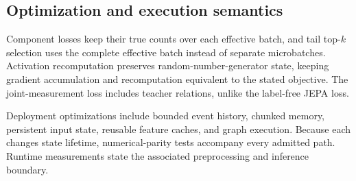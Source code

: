 \subsection{Optimization and execution semantics}
Component losses keep their true counts over each effective batch, and tail top-$k$ selection uses the complete effective batch instead of separate microbatches. Activation recomputation preserves random-number-generator state, keeping gradient accumulation and recomputation equivalent to the stated objective. The joint-measurement loss includes teacher relations, unlike the label-free JEPA loss. 

Deployment optimizations include bounded event history, chunked memory, persistent input state, reusable feature caches, and graph execution. Because each changes state lifetime, numerical-parity tests accompany every admitted path. Runtime measurements state the associated preprocessing and inference boundary.
